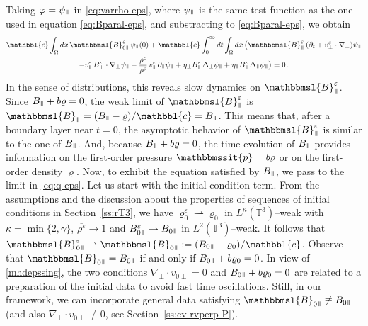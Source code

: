 \documentclass[11pt,reqno]{amsart}
\def \T{{\mathbb{T}}}
\newcommand{\myparallel}{{\mkern3mu\vphantom{\perp}\vrule depth 0pt\mkern2mu\vrule depth 0pt\mkern3mu}}
\begin{document}
Taking $ \varphi = \psi_\myparallel $ in \eqref{eq:varrho-eps}, where $ \psi_\myparallel $ is the same test function as the one used in equation \eqref{eq:Bparal-eps}, and substracting to \eqref{eq:Bparal-eps}, we obtain
\begin{multline}
\label{eq:q-eps} \mathbbl{c} 
\int_\Omega dx \, \mathbbmsl{B}_{0\myparallel}^\varepsilon \,  \psi_\myparallel(0) + \mathbbl{c} 
\int_0^\infty dt \int_\Omega dx \, \big(
\mathbbmsl{B}_\myparallel^\varepsilon \,  (\partial_t  + v_\perp^\varepsilon \cdot \nabla_\perp ) \psi_\myparallel
\\
- v_\myparallel^\varepsilon \,  B_\perp^\varepsilon \cdot \nabla_\perp \psi_\myparallel
- \frac{\rho^\varepsilon}{\overline{\rho^\varepsilon}}\, v_\myparallel^\varepsilon \, \partial_\myparallel  \psi_\myparallel
+ \eta_\perp B_{\myparallel }^\varepsilon \, \Delta_\perp \psi_\myparallel + \eta_\myparallel B_{\myparallel }^\varepsilon \, \Delta_\myparallel \psi_\myparallel
\big) 
=0\, .
\end{multline}
In the sense of distributions, this reveals  slow dynamics on $ \mathbbmsl{B}_\myparallel^\varepsilon $. Since $ B_\myparallel + b \varrho=0$, the weak limit of $ \mathbbmsl{B}_\myparallel^\varepsilon $ is $ \mathbbmsl{B}_\myparallel = (B_\myparallel - \varrho) / \mathbbl{c} =  B_\myparallel $. This means that, after a boundary layer near $ t = 0 $, the asymptotic behavior  of $ \mathbbmsl{B}_\myparallel^\varepsilon $ is similar to the one of $ B_\myparallel $. And, because $ B_\myparallel + b \varrho=0$, the time evolution of $ B_\myparallel $ provides information on the first-order pressure $ \mathbbmssit{p} = b \varrho$ or on the first-order density $\varrho $. Now, to exhibit the equation satisfied by $ B_\myparallel $, we pass to the limit in \eqref{eq:q-eps}. Let us start with the initial condition term. From the assumptions and the  discussion about the properties of sequences of initial conditions in Section~\ref{ss:rT3}, we have $\varrho_0^\varepsilon \rightharpoonup \varrho_0$ in $L^\kappa(\T^3)$--weak with $\kappa=\min\{2,\gamma\}$, $ \overline{\rho^\varepsilon} \rightarrow 1 $ and $ B_{0\myparallel}^\varepsilon \rightharpoonup B_{0\myparallel} $ in $L^2(\T^3)$--weak. It follows that $ \mathbbmsl{B}_{0\myparallel}^\varepsilon \rightharpoonup \mathbbmsl{B}_{0\myparallel} := (B_{0\myparallel} - \varrho_0 )/\mathbbl{c} $. Observe that $ \mathbbmsl{B}_{0\myparallel} =  B_{0\myparallel} $ if and only if $ B_{0\myparallel} + b \varrho_0 = 0 $. In view of \eqref{mhdepssing}, the two conditions $ \nabla_\perp \cdot v_{0\perp} = 0 $ and $ B_{0\myparallel} + b \varrho_0 = 0 $ are related to a preparation of the initial data to avoid fast time oscillations. Still, in our framework, we can incorporate general data satisfying $ \mathbbmsl{B}_{0\myparallel} \not \equiv  B_{0\myparallel} $ (and also  $ \nabla_\perp \cdot v_{0\perp} \not \equiv 0$, see Section~\ref{ss:cv-rvperp-P}).
\end{document}
